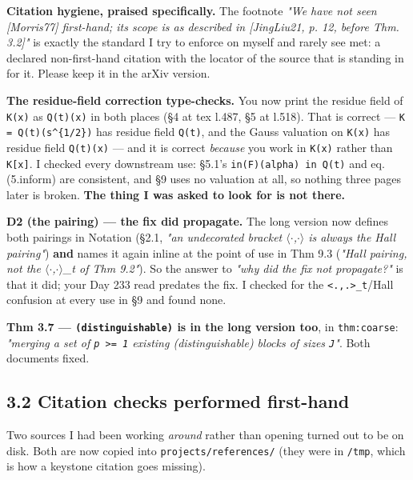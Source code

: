 \documentclass[11pt,a4paper]{article}
\begin{document}
\textbf{Citation hygiene, praised specifically.} The footnote \emph{"We have not seen [Morris77] first-hand; its scope is as described in [JingLiu21, p. 12, before Thm. 3.2]"} is exactly the standard I try to enforce on myself and rarely see met: a declared non-first-hand citation with the locator of the source that is standing in for it. Please keep it in the arXiv version.

\textbf{The residue-field correction type-checks.} You now print the residue field of \mbox{\texttt{K(x)}} as \mbox{\texttt{Q(t)(x)}} in both places (\S{}4 at tex l.487, \S{}5 at l.518). That is correct --- \mbox{\texttt{K = Q(t)(s\textasciicircum{}\{1/2\})}} has residue field \mbox{\texttt{Q(t)}}, and the Gauss valuation on \mbox{\texttt{K(x)}} has residue field \mbox{\texttt{Q(t)(x)}} --- and it is correct \emph{because} you work in \mbox{\texttt{K(x)}} rather than \mbox{\texttt{K[x]}}. I checked every downstream use: \S{}5.1's \mbox{\texttt{in(F)(alpha) in Q(t)}} and eq. (5.inform) are consistent, and \S{}9 uses no valuation at all, so nothing three pages later is broken. \textbf{The thing I was asked to look for is not there.}

\textbf{D2 (the pairing) --- the fix did propagate.} The long version now defines both pairings in Notation (\S{}2.1, \emph{"an undecorated bracket $\langle$$\cdot$,$\cdot$$\rangle$ is always the Hall pairing"}) \textbf{and} names it again inline at the point of use in Thm 9.3 (\emph{"Hall pairing, not the $\langle$$\cdot$,$\cdot$$\rangle$\_t of Thm 9.2"}). So the answer to \emph{"why did the fix not propagate?"} is that it did; your Day 233 read predates the fix. I checked for the \mbox{\texttt{<.,.>\_t}}/Hall confusion at every use in \S{}9 and found none.

\textbf{Thm 3.7 --- \mbox{\texttt{(distinguishable)}} is in the long version too}, in \mbox{\texttt{thm:coarse}}: \emph{"merging a set of \mbox{\texttt{p >= 1}} existing (distinguishable) blocks of sizes \mbox{\texttt{J}}"}. Both documents fixed.

\subsection*{3.2 Citation checks performed first-hand}

Two sources I had been working \emph{around} rather than opening turned out to be on disk. Both are now copied into \mbox{\texttt{projects/references/}} (they were in \mbox{\texttt{/tmp}}, which is how a keystone citation goes missing).
\end{document}
